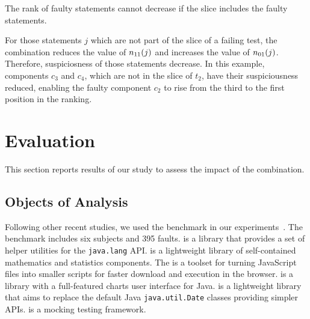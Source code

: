 \documentclass[sigplan,10pt,review,anonymous]{acmart}\settopmatter{printfolios=true,printccs=false,printacmref=false}
\begin{document}

\begin{theorem}
  The rank of faulty statements cannot decrease if the slice includes
  the faulty statements.
\end{theorem}  

For those statements $j$ which are not part of the slice of a failing
test, the combination reduces the value of $n_{11}(j)$ and increases the
value of $n_{01}(j)$. Therefore, suspiciosness of those statements
decrease. In this example, components $c_3$ and $c_4$, which are not
in the slice of $t_2$, have their suspiciousness reduced, enabling the
faulty component $c_2$ to rise from the third to the first position in
the ranking. 


\section{Evaluation}
\label{sec:eval}


This section reports results of our study to assess the impact of the
\comb{} combination.

\subsection{Objects of Analysis}

Following other recent studies, we used the \dfj{} benchmark in our
experiments~\cite{just-defects4j-issta2014}. The \dfj{} benchmark
includes six subjects and 395 faults.
\lang{} is a library
that provides a set of helper utilities for the {\small\texttt{java.lang}}
API. \cmath{} is a lightweight library of self-contained
mathematics and statistics components. The \closure{} is a toolset for
turning JavaScript files into smaller scripts for faster
download and execution in the browser. \chart{} is a library with a
full-featured charts user interface for Java. \jtime{} is a
lightweight library that aims to replace the default Java
{\small\texttt{java.util.Date}} classes providing simpler APIs. \mockito{} is
a mocking testing framework.
\end{document}
